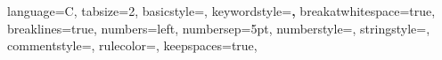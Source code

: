 \documentclass[a4paper, 12pt, twoside]{book}
\numberwithin{equation}{section}
\begin{document}
%



\lstset
{
language=C, 
tabsize=2,  
basicstyle=\footnotesize, 
keywordstyle=\textbf,
breakatwhitespace=true,         %
breaklines=true,                 %
numbers=left,                    %
numbersep=5pt,                   %
numberstyle=\tiny\color{mygray}, %
stringstyle=\color{mymauve},
commentstyle=\color{mygreen},
rulecolor=\color{black},
keepspaces=true,                 %
}



\thispagestyle{empty}
\end{document}
